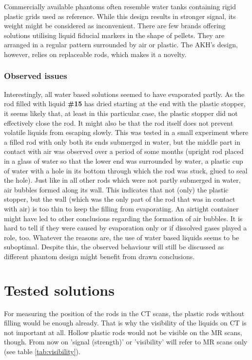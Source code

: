 Commercially available phantoms often resemble water tanks containing rigid plastic grids used as reference.
While this design results in stronger signal, its weight might be considered as inconvenient.
There are few brands offering solutions utilising liquid fiducial markers in the shape of pellets.
They are arranged in a regular pattern surrounded by air or plastic.
The AKH's design, however, relies on replaceable rods, which makes it a novelty.

\subsubsection{Observed issues}

Interestingly, all water based solutions seemed to have evaporated partly.
As the rod filled with liquid \textbf{\#15} has dried starting at the end with the plastic stopper, it seems likely that, at least in this particular case, the plastic stopper did not effectively close the rod.
It might also be that the rod itself does not prevent volatile liquids from escaping slowly.
This was tested in a small experiment where a filled rod with only both its ends submerged in water, but the middle part in contact with air was observed over a period of some months (upright rod placed in a glass of water so that the lower end was surrounded by water, a plastic cup of water with a hole in its bottom through which the rod was stuck, glued to seal the hole).
Just like in all other rods which were not partly submerged in water, air bubbles formed along its wall.
This indicates that not (only) the plastic stopper, but the wall (which was the only part of the rod that was in contact with air) is too thin to keep the filling from evaporating.
An airtight container might have led to other conclusions regarding the formation of air bubbles.
It is hard to tell if they were caused by evaporation only or if dissolved gases played a role, too.
Whatever the reasons are, the use of water based liquids seems to be suboptimal.
Despite this, the observed behaviour will still be discussed as different phantom design might benefit from drawn conclusions.

\section{Tested solutions}

For measuring the position of the rods in the CT scans, the plastic rods without filling would be enough already.
That is why the visibility of the liquids on CT is not important at all.
Hollow plastic rods would not be visible on the MR scans, though.
From now on 'signal (strength)' or 'visibility' will refer to MR scans only (see table \ref{tab:visibility}).

